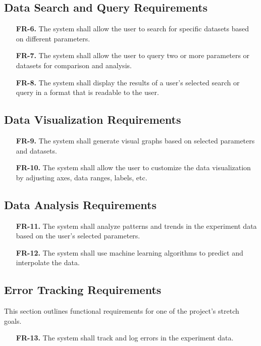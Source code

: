 \documentclass[12pt]{article}
\begin{document}
\subsection{Data Search and Query Requirements}
\begin{enumerate}
  \item[\textbf{FR-6.}] The system shall allow the user to search for specific datasets based on different parameters.
  \item[\textbf{FR-7.}] The system shall allow the user to query two or more parameters or datasets for comparison and analysis.
  \item[\textbf{FR-8.}] The system shall display the results of a user’s selected search or query in a format that is readable to the user.
\end{enumerate}

\subsection{Data Visualization Requirements}
\begin{enumerate}
  \item[\textbf{FR-9.}] The system shall generate visual graphs based on selected parameters and datasets.
  \item[\textbf{FR-10.}] The system shall allow the user to customize the data visualization by adjusting axes, data ranges, labels, etc.
\end{enumerate}

\subsection{Data Analysis Requirements}
\begin{enumerate}
    \item[\textbf{FR-11.}] The system shall analyze patterns and trends in the experiment data based on the user’s selected parameters.
    \item[\textbf{FR-12.}] The system shall use machine learning algorithms to predict and interpolate the data.
\end{enumerate}

\subsection{Error Tracking Requirements}
This section outlines functional requirements for one of the project's stretch goals.
\begin{enumerate}
  \item[\textbf{FR-13.}] The system shall track and log errors in the experiment data.
\end{enumerate}
\end{document}
